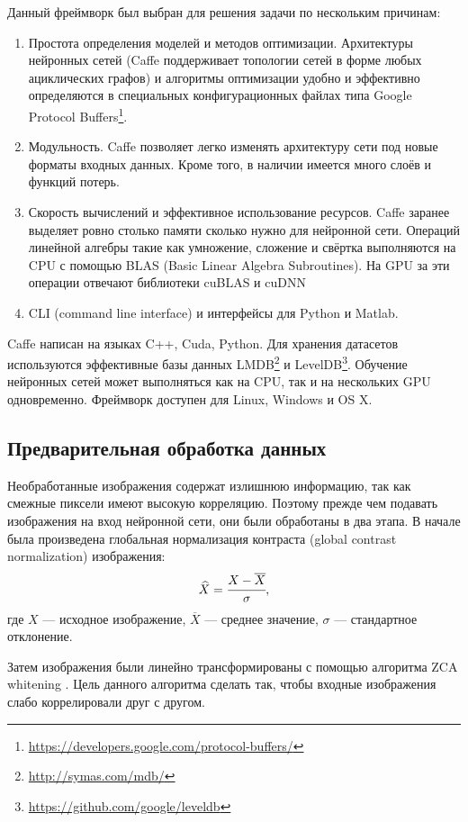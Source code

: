 Данный фреймворк был выбран для решения задачи по нескольким причинам:
\begin{enumerate}
    \item Простота определения моделей и методов оптимизации. Архитектуры нейронных сетей
    (Caffe поддерживает топологии сетей в форме любых ациклических графов) и алгоритмы оптимизации удобно и 
    эффективно определяются в специальных конфигурационных файлах типа Google Protocol 
    Buffers\footnote{\url{https://developers.google.com/protocol-buffers/}}. 
    \item Модульность. Caffe позволяет легко изменять архитектуру сети под новые форматы входных данных. Кроме того, в наличии 
    имеется много слоёв и функций потерь.
    \item Скорость вычислений и эффективное использование ресурсов. Caffe заранее выделяет ровно столько памяти сколько нужно для 
    нейронной сети. Операций линейной алгебры такие как умножение, сложение и свёртка выполняются на CPU с помощью BLAS (Basic 
    Linear Algebra Subroutines). На GPU за эти операции отвечают библиотеки cuBLAS и cuDNN 
    \cite{DBLP:journals/corr/ChetlurWVCTCS14}
    \item CLI (command line interface) и интерфейсы для Python и Matlab.
\end{enumerate}

Caffe написан на языках C++, Cuda, Python. Для хранения датасетов используются эффективные базы данных 
LMDB\footnote{\url{http://symas.com/mdb/}} и LevelDB\footnote{\url{https://github.com/google/leveldb}}. Обучение нейронных сетей 
может выполняться как на CPU, так и на нескольких GPU одновременно. Фреймворк доступен для Linux, Windows и OS X.

\subsection{Предварительная обработка данных}
Необработанные изображения содержат излишнюю информацию, так как смежные пиксели имеют высокую корреляцию. Поэтому прежде чем 
подавать изображения на вход нейронной сети, они были обработаны в два этапа. В начале была произведена глобальная нормализация контраста
(global contrast normalization) изображения:
\[ \widehat{X} = \cfrac{X - \overline{X}}{\sigma},\]
где $X$ --- исходное изображение, $\overline{X}$ --- среднее значение, $\sigma$ --- стандартное отклонение.

Затем изображения были линейно трансформированы с помощью алгоритма ZCA whitening \cite{learningmultiple}.
Цель данного алгоритма сделать так, чтобы входные изображения слабо коррелировали друг с другом.

